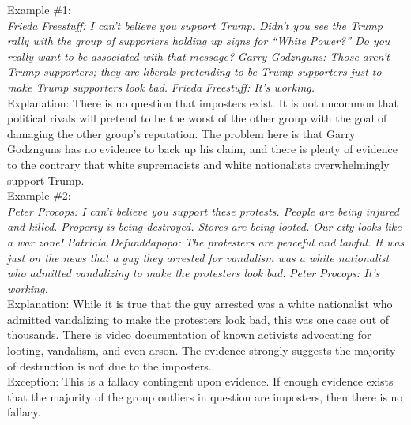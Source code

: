 \documentclass[a4paper,12pt,single,pdftex]{scrartcl}
\begin{document}
    
      Example \#1:
    \\

    
      {\em Frieda Freestuff: I can’t believe you support Trump. Didn’t you see the Trump rally with the group of supporters holding up signs for “White Power?” Do you really want to be associated with that message?} \newline
{\em Garry Godznguns: Those aren’t Trump supporters; they are liberals pretending to be Trump supporters just to make Trump supporters look bad.} \newline
{\em Frieda Freestuff: It’s working.}
    \\

    
      Explanation: There is no question that imposters exist. It is not uncommon that political rivals will pretend to be the worst of the other group with the goal of damaging the other group’s reputation. The problem here is that Garry Godznguns has no evidence to back up his claim, and there is plenty of evidence to the contrary that white supremacists and white nationalists overwhelmingly support Trump.
    \\

    
      Example \#2:
    \\

    
      {\em Peter Procops: I can’t believe you support these protests. People are being injured and killed. Property is being destroyed. Stores are being looted. Our city looks like a war zone!} \newline
{\em Patricia Defunddapopo: The protesters are peaceful and lawful. It was just on the news that a guy they arrested for vandalism was a white nationalist who admitted vandalizing to make the protesters look bad.} \newline
{\em Peter Procops: It’s working.}
    \\

    
      Explanation: While it is true that the guy arrested was a white nationalist who admitted vandalizing to make the protesters look bad, this was one case out of thousands. There is video documentation of known activists advocating for looting, vandalism, and even arson. The evidence strongly suggests the majority of destruction is not due to the imposters.
    \\

    
      Exception: This is a fallacy contingent upon evidence. If enough evidence exists that the majority of the group outliers in question are imposters, then there is no fallacy.
    \\
\end{document}
